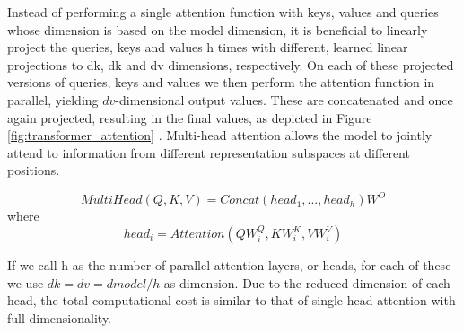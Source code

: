 Instead of performing a single attention function with keys, values and queries whose dimension is based on the model dimension, it is beneficial to linearly project the queries, keys and values h times with different, learned linear projections to dk, dk and dv dimensions, respectively. On each of these projected versions of queries, keys and values we then perform the attention function in parallel, yielding $dv$-dimensional output values. These are concatenated and once again projected, resulting in the final values, as depicted in Figure \ref{fig:transformer_attention} .
Multi-head attention allows the model to jointly attend to information from different representation subspaces at different positions.

$$MultiHead(Q, K, V ) = Concat(head_{1}, ..., head_{h})W^O$$
where
$$head_{i} = Attention(QW^Q_{i}, KW^K_{i}, VW^V_{i})$$

If we call h as the number of parallel attention layers, or heads, for each of these we use $dk=dv=dmodel/h$ as dimension. Due to the reduced dimension of each head, the total computational cost is similar to that of single-head attention with full dimensionality.
